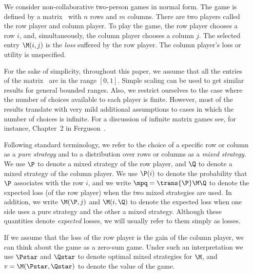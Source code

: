 We consider non-collaborative two-person games in normal form.  The
game is defined by a matrix \M\ with $n$ rows and $m$ columns.  There
are two players called the row player and column player.  To play the
game, the row player chooses a row $i$, and, simultaneously, the
column player chooses a column $j$.  The selected entry $\M(i,j)$ is
the {\em loss\/} suffered by the row player.
The column player's loss or utility is unspecified.

For the sake of simplicity, throughout this paper,
we assume that all the entries of the matrix \M\ are in the
range $[0,1]$.  Simple scaling can be used to get similar
results for general bounded ranges.
Also, we restrict ourselves to the case where the number of
choices available to each player is finite. However, most of the
results translate with very mild additional assumptions to cases in
which the number of choices is infinite. For a discussion of infinite
matrix games see, for instance, Chapter~2 in Ferguson~\cite{Ferguson67}.

Following standard terminology, we refer to the choice of a specific
row or column as  a {\em pure strategy\/} and to a distribution over
rows or columns as a {\em mixed strategy}. We use $\P$ to 
denote a mixed strategy of the row player, and $\Q$ to denote a mixed
strategy of the column player. We use $\P(i)$ to denote the
probability that $\P$ associates with the row $i$, and
we write $\mpq = \trans{\P} \M \Q$ to denote
the expected loss (of the row player) when the two mixed strategies
are used. In addition, we write $\M(\P,j)$ and $\M(i,\Q)$ to denote
the expected loss when one side uses a pure strategy and the other a
mixed strategy.
Although these quantities denote {\em expected\/} losses, we will
usually refer to them simply as losses.

If we assume that the loss of the row player is the gain of the column
player, we can think about the game as a zero-sum game. Under such an
interpretation we use $\Pstar$ and $\Qstar$ to denote optimal mixed
strategies for $\M$, and $v=\M(\Pstar,\Qstar)$ to denote the value of
the game.

